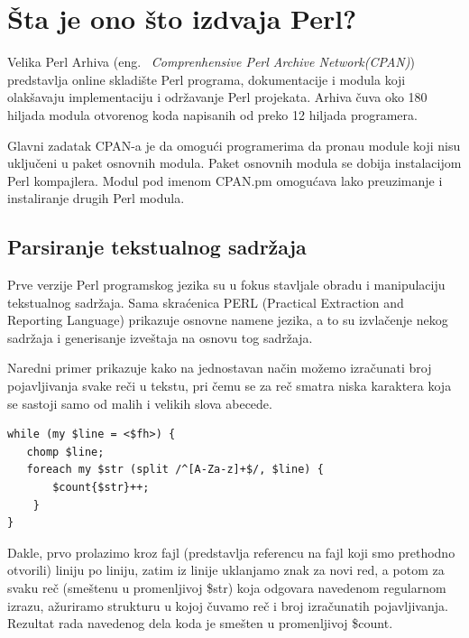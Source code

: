 \documentclass[a4paper]{article}
\begin{document}
\section{\v Sta je ono što izdvaja Perl?}

Velika Perl Arhiva\cite{cpan} (eng. ~{\em Comprenhensive Perl Archive Network(CPAN)}) 
 predstavlja online skladište Perl programa, dokumentacije i modula koji olakšavaju implementaciju i održavanje Perl projekata. Arhiva čuva oko 180 hiljada modula otvorenog koda napisanih od preko 12 hiljada 
 programera.

Glavni zadatak CPAN-a je da omogu\'ci programerima da prona\dj{}u module koji nisu uklju\v ceni u paket osnovnih modula. Paket osnovnih modula se dobija instalacijom Perl kompajlera. %
Modul pod imenom CPAN.pm omogućava lako preuzimanje i instaliranje drugih Perl modula. 


\subsection{Parsiranje tekstualnog sadržaja}

Prve verzije Perl programskog jezika su u fokus stavljale obradu i manipulaciju tekstualnog sadržaja. Sama skra\'cenica PERL (Practical Extraction and Reporting Language) prikazuje osnovne namene jezika, a to su izvlačenje nekog sadržaja i generisanje izveštaja na osnovu tog sadržaja.

Naredni primer prikazuje kako na jednostavan način možemo izračunati broj pojavljivanja svake reči u tekstu, pri čemu se za reč smatra niska karaktera koja se sastoji samo od malih i velikih slova abecede.

\begin{lstlisting}[label=simple]
while (my $line = <$fh>) {
   chomp $line;
   foreach my $str (split /^[A-Za-z]+$/, $line) {
       $count{$str}++;
    } 
}
\end{lstlisting}


Dakle, prvo prolazimo kroz fajl (predstavlja referencu na fajl koji smo 
prethodno otvorili) liniju po liniju, zatim iz linije uklanjamo znak za novi red, a potom za svaku reč (smeštenu u promenljivoj \$str) koja odgovara navedenom regularnom izrazu, ažuriramo strukturu u kojoj čuvamo reč i broj izračunatih pojavljivanja. Rezultat rada navedenog 
dela koda je smešten u promenljivoj \$count. \cite{cooksnd}
\end{document}
